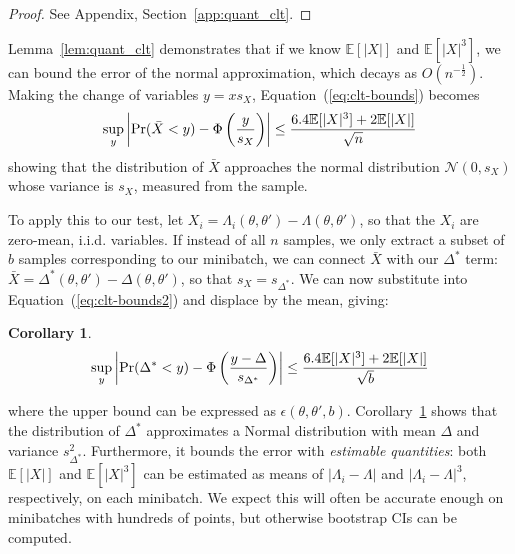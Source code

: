 \documentclass[letterpaper]{article}
\newcommand{\mE}{\mathbb{E}}
\newtheorem{corollary}{Corollary}
\begin{document}
\begin{proof}
See Appendix, Section~\ref{app:quant_clt}.
\end{proof}

Lemma~\ref{lem:quant_clt} demonstrates that if we know $\mE[|X|]$ and
$\mE[|X|^3]$, we can bound the error of the normal approximation, which decays
as $O(n^{-\frac{1}{2}})$. Making the change of variables $y = x s_X$,
Equation~(\ref{eq:clt-bounds}) becomes
\begin{equation}\label{eq:clt-bounds2}
   \sup_y\left|{\rm Pr}(\bar{X}< y) - \Phi\left(\frac{y}{s_X}\right)\right| \leq
   \frac{6.4\mE[|X|^3]+2\mE[|X|]}{\sqrt{n}}
\end{equation}
showing that the distribution of $\bar{X}$ approaches the normal distribution
$\mathcal{N}(0,s_X)$ whose variance is $s_X$,
measured from the sample.

To apply this to our test, let $X_i = \Lambda_i(\theta,\theta') -
\Lambda(\theta,\theta')$, so that the $X_i$ are zero-mean, i.i.d. variables. If
instead of all $n$ samples, we only extract a subset of $b$ samples
corresponding to our minibatch, we can connect $\bar{X}$ with our $\Delta^*$
term: $\bar{X} = \Delta^*(\theta,\theta') - \Delta(\theta,\theta')$, so that
$s_X = s_{\Delta^*}$. We can now substitute into Equation~(\ref{eq:clt-bounds2})
and displace by the mean, giving:

\begin{corollary}\label{cor:our_bound_delta_prime}
\small
\begin{equation}
\sup_y \left|{\rm Pr}(\Delta^*< y) -\Phi\left(\frac{y-\Delta}{s_{\Delta^*}}\right)\right| \leq \frac{6.4\mE[|X|^3]+2\mE[|X|]}{\sqrt{b}}
\end{equation}
\normalsize
\end{corollary} %
where the upper bound can be expressed as $\epsilon(\theta,\theta',b)$.
Corollary~\ref{cor:our_bound_delta_prime} shows that the distribution of
$\Delta^*$ approximates a Normal distribution with mean $\Delta$ and variance
$s^2_{\Delta^*}$. Furthermore, it bounds the error with \emph{estimable
quantities}: both $\mE[|X|]$ and $\mE[|X|^3]$ can be estimated as means of
$|\Lambda_i - \Lambda|$ and $|\Lambda_i - \Lambda|^3$, respectively, on each
minibatch. We expect this will often be accurate enough on minibatches with
hundreds of points, but otherwise bootstrap CIs can be computed.

\end{document}
